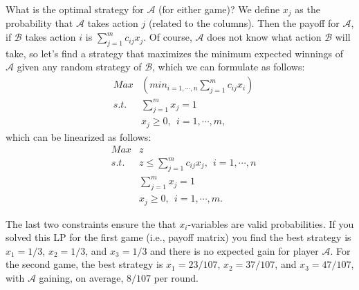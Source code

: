 \medskip What is the optimal strategy for $\mathcal{A}$ (for either game)? We define $x_j$ as the probability that $\mathcal{A}$ takes action $j$ (related to the columns).  Then the payoff for $\mathcal{A}$, if $\mathcal{B}$ takes action $i$ is $\sum_{j=1}^m c_{ij}x_{j}$. Of course, $\mathcal{A}$ does not know what action $\mathcal{B}$ will take, so let's find a strategy that maximizes the minimum expected winnings of $\mathcal{A}$ given any random strategy of $\mathcal{B}$, which we can formulate as follows:
\begin{eqnarray}
& Max  & (min_{i=1,\cdots,n} \sum_{j=1}^m  c_{ij}x_i) \nonumber \\
& s.t. & \sum_{j=1}^m x_j = 1 \nonumber \\
&      & x_j \ge 0,~~ i = 1,\cdots,m, \nonumber
\end{eqnarray}
which can be linearized as follows:
\begin{eqnarray}
& Max  & z \nonumber \\
& s.t. & z \le \sum_{j=1}^m  c_{ij}x_j,~~ i = 1,\cdots,n \nonumber \\
&      & \sum_{j=1}^m x_j = 1 \nonumber \\
&      & x_j \ge 0,~~ i = 1,\cdots,m. \nonumber
\end{eqnarray}

The last two constraints ensure the that $x_i$-variables are valid probabilities. If you solved this LP for the first game (i.e., payoff matrix) you find the best strategy is $x_1 = 1/3$, $x_2 = 1/3$, and $x_3 = 1/3$ and there is no expected gain for player $\mathcal{A}$.  For the second game, the best strategy is $x_1 = 23/107$, $x_2 = 37/107$, and $x_3 = 47/107$, with $\mathcal{A}$ gaining, on average, $8/107$ per round.
